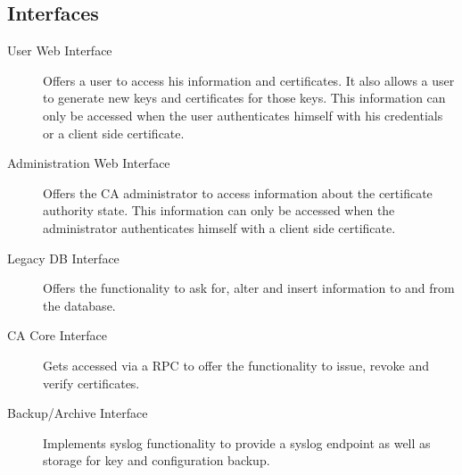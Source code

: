 \documentclass[a4paper, toc=index, 12pt, DIV14, twoside, BCOR2cm, headsepline, numbers=noenddot, bibliography=totoc]{report}
\begin{document}
\subsection{Interfaces}
\begin{description}
\item[User Web Interface ]
Offers a user to access his information and certificates. It also allows a user to generate new keys and certificates for those keys. This information can only be accessed when the user authenticates himself with his credentials or a client side certificate.

\item[Administration Web Interface ]
Offers the CA administrator to access information about the certificate authority state. This information can only be accessed when the administrator authenticates himself with a client side certificate.

\item[Legacy DB Interface ]
Offers the functionality to ask for, alter and insert information to and from the database.

\item[CA Core Interface ]
Gets accessed via a RPC to offer the functionality to issue, revoke and verify certificates.

\item[Backup/Archive Interface ]
Implements syslog functionality to provide a syslog endpoint as well as storage for key and configuration backup.
\end{description}
\end{document}
